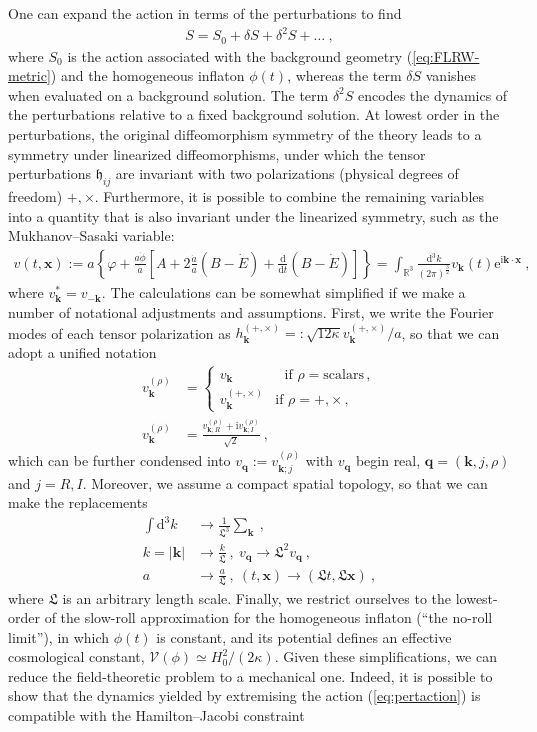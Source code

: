 \documentclass[12pt]{iopart}
\def\eq#1{\begin{equation}\begin{aligned}#1\end{aligned}\end{equation}}
\def\eref#1{(\ref{eq:#1})}
\def\D{\mathrm{d}}
\def\e{\mathrm{e}}
\def\I{\mathrm{i}}
\def\Del#1#2{\frac{\D#1}{\D#2}}
\def\x{\mathbf{x}}
\def\k{\mathbf{k}}
\def\q{\mathbf{q}}
\begin{document}
One can expand the action in terms of the perturbations to find
\eq{\label{eq:pertaction}
S = S_0+\delta S+\delta^2S+\ldots \ , 
}
where $S_0$ is the action associated with the background geometry \eref{FLRW-metric} and the homogeneous inflaton $\phi(t)$, whereas the term $\delta S$ vanishes when evaluated on a background solution. The term $\delta^2S$ encodes the dynamics of the perturbations relative to a fixed background solution. At lowest order in the perturbations, the original diffeomorphism symmetry of the theory leads to a symmetry under linearized diffeomorphisms, under which the tensor perturbations $\mathfrak{h}_{ij}$ are invariant with two polarizations (physical degrees of freedom) $+,\times$. Furthermore, it is possible to combine the remaining variables into a quantity that is also invariant under the linearized symmetry, such as the Mukhanov--Sasaki variable:
\eq{
v(t,\x):=a\left\{\varphi+\frac{a\dot{\phi}}{\dot{a}}\left[A+2\frac{\dot{a}}{a}(B-\dot{E})+\Del{}{t}(B-\dot{E})\right]\right\} = \int_{\mathbb{R}^3}\frac{\D^3k}{(2\pi)^{\frac32}}v_{\mathbf{k}}(t)\e^{\I\mathbf{k}\cdot\x} \ ,
}
where $v_{\k}^* = v_{-\k}$. The calculations can be somewhat simplified if we make a number of notational adjustments and assumptions. First, we write the Fourier modes of each tensor polarization as $h_{\k}^{(+,\times)} =: \sqrt{12\kappa}v_{\k}^{(+,\times)}/a$, so that we can adopt a unified notation
\eq{\label{eq:vq}
v_{\k}^{(\rho)} &= \left\{\begin{matrix}
\!\!\!\!\!v_{\k} & \ \ \ \text{if }\rho = \text{scalars}\,,\\
v_{\k}^{(+,\times)} & \text{if }\rho = +,\times \,,
\end{matrix}\right. \\
v_{\k}^{(\rho)} &= \frac{v_{\k;R}^{(\rho)}+\I v_{\k;I}^{(\rho)}}{\sqrt{2}} \ ,
}
which can be further condensed into $v_{\q} := v_{\k;j}^{(\rho)}$ with $v_{\q}$ begin real, $\q = (\k,j,\rho)$ and $j=R,I$. Moreover, we assume a compact spatial topology, so that we can make the replacements \citep{KTV1,KTV2,KTV3,Brizuela:2015tzl,Brizuela:2016gnz}
\eq{\label{eq:replacements}
\int\D^3k&\to\frac{1}{\mathfrak{L}^3}\sum_{\k}\ ,\\ 
k = |\k| &\to \frac{k}{\mathfrak{L}} \ , \
v_{\q}\to \mathfrak{L}^2 v_{\q} \ , \\
a &\to \frac{a}{\mathfrak{L}} \ , \ (t,\x) \to (\mathfrak{L}t,\mathfrak{L}\x) \ ,
}
where $\mathfrak{L}$ is an arbitrary length scale. Finally, we restrict ourselves to the lowest-order of the slow-roll approximation for the homogeneous inflaton (``the no-roll limit''), in which $\phi(t)$ is constant, and its potential defines an effective cosmological constant, $\mathcal{V}(\phi) \simeq H_0^2/(2\kappa)$. Given these simplifications, we can reduce the field-theoretic problem to a mechanical one. Indeed, it is possible to show that the dynamics yielded by extremising the action \eref{pertaction} is compatible with the Hamilton--Jacobi constraint
\end{document}
